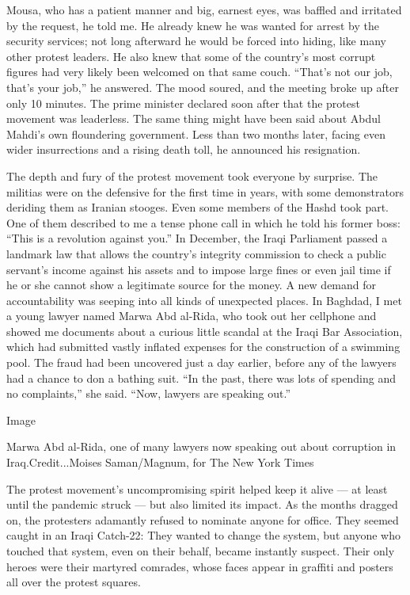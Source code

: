 Mousa, who has a patient manner and big, earnest eyes, was baffled and
irritated by the request, he told me. He already knew he was wanted for
arrest by the security services; not long afterward he would be forced
into hiding, like many other protest leaders. He also knew that some of
the country's most corrupt figures had very likely been welcomed on that
same couch. ``That's not our job, that's your job,'' he answered. The
mood soured, and the meeting broke up after only 10 minutes. The prime
minister declared soon after that the protest movement was leaderless.
The same thing might have been said about Abdul Mahdi's own floundering
government. Less than two months later, facing even wider insurrections
and a rising death toll, he announced his resignation.

The depth and fury of the protest movement took everyone by surprise.
The militias were on the defensive for the first time in years, with
some demonstrators deriding them as Iranian stooges. Even some members
of the Hashd took part. One of them described to me a tense phone call
in which he told his former boss: ``This is a revolution against you.''
In December, the Iraqi Parliament passed a landmark law that allows the
country's integrity commission to check a public servant's income
against his assets and to impose large fines or even jail time if he or
she cannot show a legitimate source for the money. A new demand for
accountability was seeping into all kinds of unexpected places. In
Baghdad, I met a young lawyer named Marwa Abd al-Rida, who took out her
cellphone and showed me documents about a curious little scandal at the
Iraqi Bar Association, which had submitted vastly inflated expenses for
the construction of a swimming pool. The fraud had been uncovered just a
day earlier, before any of the lawyers had a chance to don a bathing
suit. ``In the past, there was lots of spending and no complaints,'' she
said. ``Now, lawyers are speaking out.''

Image

Marwa Abd al-Rida, one of many lawyers now speaking out about corruption
in Iraq.Credit...Moises Saman/Magnum, for The New York Times

The protest movement's uncompromising spirit helped keep it alive --- at
least until the pandemic struck --- but also limited its impact. As the
months dragged on, the protesters adamantly refused to nominate anyone
for office. They seemed caught in an Iraqi Catch-22: They wanted to
change the system, but anyone who touched that system, even on their
behalf, became instantly suspect. Their only heroes were their martyred
comrades, whose faces appear in graffiti and posters all over the
protest squares.

